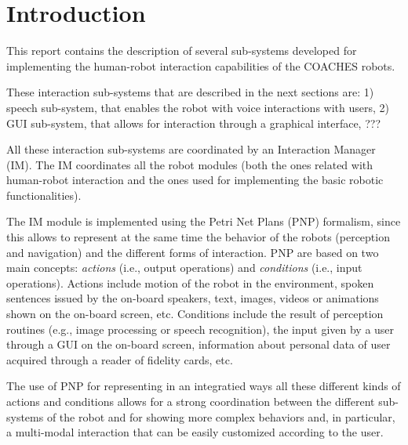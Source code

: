 \section{Introduction}

This report contains the description of several sub-systems developed for implementing the human-robot interaction capabilities of the COACHES robots.

These interaction sub-systems that are described in the next sections are: 1) speech sub-system, that enables the robot with voice interactions with users, 2) GUI sub-system, that allows for interaction through a graphical interface, ???

All these interaction sub-systems are coordinated by an Interaction Manager (IM).
The IM coordinates all the robot modules (both the ones related with human-robot interaction and the ones used for implementing the basic robotic functionalities).

The IM module is implemented using the Petri Net Plans (PNP) formalism, since this allows to represent at the same time the behavior of the robots (perception and navigation) and the different forms of interaction.
PNP are based on two main concepts: \emph{actions} (i.e., output operations) and \emph{conditions} (i.e., input operations). Actions include motion of the robot in the environment, spoken sentences issued by the on-board speakers, text, images, videos or animations shown on the on-board screen, etc.
Conditions include the result of perception routines (e.g., image processing or speech recognition), the input given by a user through a GUI on the on-board screen, information about personal data of user acquired through a reader of fidelity cards, etc.

The use of PNP for representing in an integratied ways all these different kinds of actions and conditions allows for a strong coordination between the different sub-systems of the robot and for showing more complex behaviors and, in particular, a multi-modal interaction that can be easily customized according to the user.





